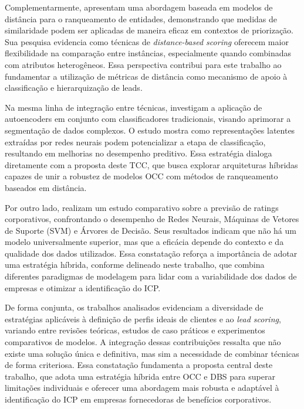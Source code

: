 Complementarmente, \citet{Qian2019} apresentam uma abordagem baseada em modelos de distância para o ranqueamento de entidades, demonstrando que medidas de similaridade podem ser aplicadas de maneira eficaz em contextos de priorização. Sua pesquisa evidencia como técnicas de \textit{distance-based scoring} oferecem maior flexibilidade na comparação entre instâncias, especialmente quando combinadas com atributos heterogêneos. Essa perspectiva contribui para este trabalho ao fundamentar a utilização de métricas de distância como mecanismo de apoio à classificação e hierarquização de leads.

Na mesma linha de integração entre técnicas, \citet{Mancisidor2018} investigam a aplicação de autoencoders em conjunto com classificadores tradicionais, visando aprimorar a segmentação de dados complexos. O estudo mostra como representações latentes extraídas por redes neurais podem potencializar a etapa de classificação, resultando em melhorias no desempenho preditivo. Essa estratégia dialoga diretamente com a proposta deste TCC, que busca explorar arquiteturas híbridas capazes de unir a robustez de modelos OCC com métodos de ranqueamento baseados em distância.

Por outro lado, \citet{Golbayani2020} realizam um estudo comparativo sobre a previsão de ratings corporativos, confrontando o desempenho de Redes Neurais, Máquinas de Vetores de Suporte (SVM) e Árvores de Decisão. Seus resultados indicam que não há um modelo universalmente superior, mas que a eficácia depende do contexto e da qualidade dos dados utilizados. Essa constatação reforça a importância de adotar uma estratégia híbrida, conforme delineado neste trabalho, que combina diferentes paradigmas de modelagem para lidar com a variabilidade dos dados de empresas e otimizar a identificação do ICP.

De forma conjunta, os trabalhos analisados evidenciam a diversidade de estratégias aplicáveis à definição de perfis ideais de clientes e ao \textit{lead scoring}, variando entre revisões teóricas, estudos de caso práticos e experimentos comparativos de modelos. A integração dessas contribuições ressalta que não existe uma solução única e definitiva, mas sim a necessidade de combinar técnicas de forma criteriosa. Essa constatação fundamenta a proposta central deste trabalho, que adota uma estratégia híbrida entre OCC e DBS para superar limitações individuais e oferecer uma abordagem mais robusta e adaptável à identificação do ICP em empresas fornecedoras de benefícios corporativos.